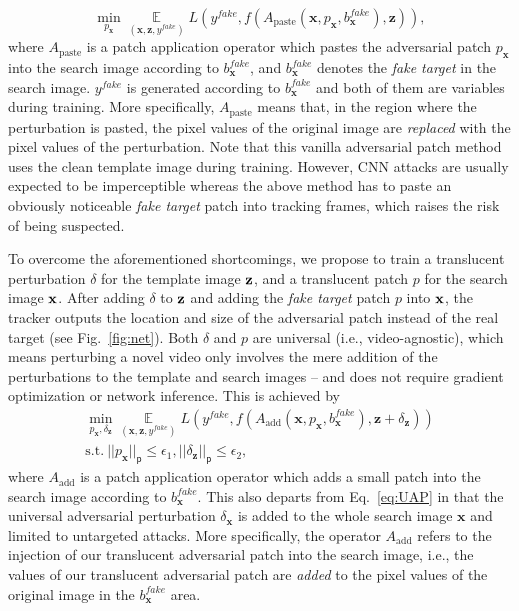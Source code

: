 \documentclass[journal]{IEEEtran}
\newcommand{\ie}{i.e.}
\renewcommand{\uline}{}
\begin{document}
\begin{equation}
    \min\limits_{p_\textbf{x}} \mathop{\mathbb{E}}\limits_{(\textbf{x}, \textbf{z}, y^{fake})} L(y^{fake}, f(A_{\text{paste}}(\textbf{x}, p_\textbf{x}, b^{fake}_{\textbf{x}}), \textbf{z})),
\end{equation}
where $A_{\text{paste}}$ is a patch application operator \cite{patch} which pastes the adversarial patch $p_\textbf{x}$ into the search image according to $b^{fake}_{\textbf{x}}$\uline{, and $b^{fake}_{\textbf{x}}$ denotes the \textit{fake target} in} the search image. $y^{fake}$ is generated according to $b^{fake}_{\textbf{x}}$ and both of them are variables during training. More specifically, $A_\text{paste}$ means that, in the region where the perturbation is pasted, the pixel values of the original image are \textit{replaced} with the pixel values of the perturbation. Note that this vanilla adversarial patch method uses the clean template image during training. However, CNN attacks are usually expected to be imperceptible whereas the above method has to paste an obviously noticeable \textit{fake target} patch into tracking frames, which raises the risk of being suspected.

To overcome the aforementioned shortcomings, we propose to train a translucent perturbation $\delta$ for the template image $\textbf z$, and a translucent patch $p$ for the search image $\textbf x$. After adding $\delta$ to $\textbf z$ and adding the \textit{fake target} patch $p$ into $\textbf x$, the tracker outputs the location and size of the adversarial patch instead of the real target (see Fig.~\ref{fig:net}). Both $\delta$ and $p$ are universal (\ie, video-agnostic), which means perturbing a novel video only involves the mere addition of the perturbations to the template and search images -- and does not require gradient optimization or network inference. This is achieved by
\begin{equation}
  \begin{gathered}
    \min\limits_{p_\textbf{x}, \delta_\textbf{z}} \mathop{\mathbb{E}}\limits_{(\textbf{x}, \textbf{z}, y^{fake})} L(y^{fake}, f(A_{\text{add}}(\textbf{x}, p_\textbf{x}, b^{fake}_{\textbf{x}}), \textbf{z} + \delta_\textbf{z}))\\
    \text{s.t.}\ ||p_\textbf{x}||_{\mathsf{p}} \le \epsilon_1, ||\delta_\textbf{z}||_{\mathsf{p}} \le \epsilon_2,
  \end{gathered}
\end{equation}
where $A_{\text{add}}$ is a patch application operator which adds \uline{a small} patch into the search image according to $b^{fake}_{\textbf{x}}$. \uline{This also departs from Eq.~\eqref{eq:UAP} in that the universal adversarial perturbation $\delta_\textbf{x}$ is added to the whole search image $\textbf{x}$ and limited to untargeted attacks. More specifically, the} operator $A_\text{add}$ refers to the injection of our translucent adversarial patch into the search image, \ie, the values of our translucent adversarial patch are \textit{added} to the pixel values of the original image in the $b^{fake}_{\textbf{x}}$ area.
\end{document}
